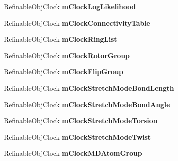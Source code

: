 \begin{DoxyCompactItemize}
Refinable\+Obj\+Clock {\bfseries m\+Clock\+Log\+Likelihood}
\item 
\mbox{\label{class_obj_cryst_1_1_molecule_a5ab45bcd6837946dde8ef134874ae02b}} 
Refinable\+Obj\+Clock {\bfseries m\+Clock\+Connectivity\+Table}
\item 
\mbox{\label{class_obj_cryst_1_1_molecule_ab19b748ec7e4ead2947027b2f38b60e2}} 
Refinable\+Obj\+Clock {\bfseries m\+Clock\+Ring\+List}
\item 
\mbox{\label{class_obj_cryst_1_1_molecule_abdfb80e948dc91137f5c568c99b1554a}} 
Refinable\+Obj\+Clock {\bfseries m\+Clock\+Rotor\+Group}
\item 
\mbox{\label{class_obj_cryst_1_1_molecule_a9654156a7376a5265c6555c23fa7316c}} 
Refinable\+Obj\+Clock {\bfseries m\+Clock\+Flip\+Group}
\item 
\mbox{\label{class_obj_cryst_1_1_molecule_a0320d6fc63fdd2d3454f6c93e21fb82d}} 
Refinable\+Obj\+Clock {\bfseries m\+Clock\+Stretch\+Mode\+Bond\+Length}
\item 
\mbox{\label{class_obj_cryst_1_1_molecule_ae641b2ae58267ce842c21e9e2c631a7e}} 
Refinable\+Obj\+Clock {\bfseries m\+Clock\+Stretch\+Mode\+Bond\+Angle}
\item 
\mbox{\label{class_obj_cryst_1_1_molecule_ae932e4a8a69c7fb3422b703854478fc2}} 
Refinable\+Obj\+Clock {\bfseries m\+Clock\+Stretch\+Mode\+Torsion}
\item 
\mbox{\label{class_obj_cryst_1_1_molecule_a83e297fa4cd4f1bebe17b9cf26838b7f}} 
Refinable\+Obj\+Clock {\bfseries m\+Clock\+Stretch\+Mode\+Twist}
\item 
\mbox{\label{class_obj_cryst_1_1_molecule_acaeac88a7cea8c699fecb137337e9f2d}} 
Refinable\+Obj\+Clock {\bfseries m\+Clock\+M\+D\+Atom\+Group}
\item 
\mbox{\label{class_obj_cryst_1_1_molecule_ad176581e146e508869e67776f0e2e3d2}} 

\end{DoxyCompactItemize}

